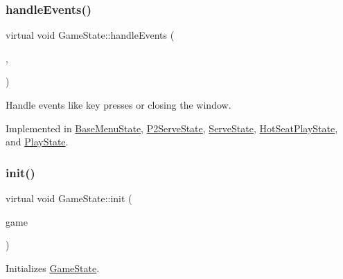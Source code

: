 \mbox{\label{class_game_state_a3ef0638514dbfe71581d593cf0f66ce5}} 
\subsubsection{\texorpdfstring{handleEvents()}{handleEvents()}}
{\footnotesize\ttfamily virtual void Game\+State\+::handle\+Events (\begin{DoxyParamCaption}\item[{\mbox{\hyperlink{class_game_engine}{Game\+Engine}} $\ast$}]{,  }\item[{sf\+::\+Event}]{ }\end{DoxyParamCaption})\hspace{0.3cm}{\ttfamily [pure virtual]}}



Handle events like key presses or closing the window. 



Implemented in \mbox{\hyperlink{class_base_menu_state_af593c53bcd111bd210b933ddb360f509}{Base\+Menu\+State}}, \mbox{\hyperlink{class_p2_serve_state_af7634dd3bdfca0279b5c9abc6632b2e4}{P2\+Serve\+State}}, \mbox{\hyperlink{class_serve_state_a8f372bdf6b72e8d4ae9eaa1b45a4d844}{Serve\+State}}, \mbox{\hyperlink{class_hot_seat_play_state_a92606c5f4b8106b4fec1482a75be3c8d}{Hot\+Seat\+Play\+State}}, and \mbox{\hyperlink{class_play_state_acdb47d9367dac45893eb9c9a45390385}{Play\+State}}.

\mbox{\label{class_game_state_a10b6e6bb31591c70d08ffcee5f29fa81}} 
\subsubsection{\texorpdfstring{init()}{init()}}
{\footnotesize\ttfamily virtual void Game\+State\+::init (\begin{DoxyParamCaption}\item[{\mbox{\hyperlink{class_game_engine}{Game\+Engine}} $\ast$}]{game }\end{DoxyParamCaption})\hspace{0.3cm}{\ttfamily [pure virtual]}}



Initializes \mbox{\hyperlink{class_game_state}{Game\+State}}. 



